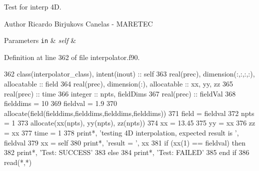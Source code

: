 Test for interp 4D. 

\begin{DoxyAuthor}{Author}
Ricardo Birjukovs Canelas -\/ M\+A\+R\+E\+T\+EC 
\end{DoxyAuthor}

\begin{DoxyParams}[1]{Parameters}
\mbox{\tt in}  & {\em self} & \\
\hline
\end{DoxyParams}


Definition at line 362 of file interpolator.\+f90.


\begin{DoxyCode}
362     \textcolor{keywordtype}{class}(interpolator\_class), \textcolor{keywordtype}{intent(inout)} :: self
363     \textcolor{keywordtype}{real(prec)}, \textcolor{keywordtype}{dimension(:,:,:,:)}, \textcolor{keywordtype}{allocatable} :: field
364     \textcolor{keywordtype}{real(prec)}, \textcolor{keywordtype}{dimension(:)}, \textcolor{keywordtype}{allocatable} :: xx, yy, zz
365     \textcolor{keywordtype}{real(prec)} :: time
366     \textcolor{keywordtype}{integer} :: npts, fieldDims
367     \textcolor{keywordtype}{real(prec)} :: fieldVal
368     fielddims = 10
369     fieldval = 1.9
370     \textcolor{keyword}{allocate}(field(fielddims,fielddims,fielddims,fielddims))
371     field = fieldval
372     npts = 1
373     \textcolor{keyword}{allocate}(xx(npts), yy(npts), zz(npts))
374     xx = 13.45
375     yy = xx
376     zz = xx
377     time = 1
378     print*, \textcolor{stringliteral}{'testing 4D interpolation, expected result is '}, fieldval
379     xx = self%
380     print*, \textcolor{stringliteral}{'result = '}, xx
381     \textcolor{keywordflow}{if} (xx(1) == fieldval) \textcolor{keywordflow}{then}
382         print*, \textcolor{stringliteral}{'Test: SUCCESS'}
383     \textcolor{keywordflow}{else}
384         print*, \textcolor{stringliteral}{'Test: FAILED'}
385 \textcolor{keywordflow}{    end if}
386     \textcolor{keyword}{read}(*,*)
\end{DoxyCode}
